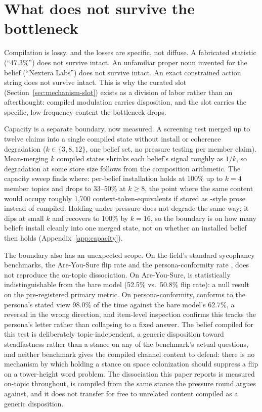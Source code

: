 \section{What does not survive the bottleneck}
\label{sec:boundary}

Compilation is lossy, and the losses are specific, not diffuse. A fabricated statistic
(``47.3\%'') does not survive intact. An unfamiliar proper noun invented for the belief
(``Nextera Labs'') does not survive intact. An exact constrained action string does not
survive intact. This is why the curated slot (Section~\ref{sec:mechanism-slot}) exists
as a division of labor rather than an afterthought: compiled modulation carries
disposition, and the slot carries the specific, low-frequency content the bottleneck
drops.

Capacity is a separate boundary, now measured. A screening test merged up to twelve
claims into a single compiled state without install or coherence degradation
(\(k \in \{3, 8, 12\}\), one belief set, no pressure testing per member
claim). Mean-merging \(k\) compiled states shrinks each belief's signal roughly as
\(1/k\), so degradation at some store size follows from the composition arithmetic. The
capacity sweep finds where: per-belief installation holds at 100\% up to \(k=4\) member
topics and drops to 33--50\% at \(k \ge 8\), the point where the same content would occupy
roughly 1{,}700 context-token-equivalents if stored as \condB{}-style prose instead of
compiled. Holding under pressure does not degrade the same way; it dips at small
\(k\) and recovers to 100\% by \(k=16\), so the boundary is on how many beliefs install
cleanly into one merged state, not on whether an installed belief then
holds\iflongversion{} (Appendix~\ref{app:capacity})\fi.

The boundary also has an unexpected scope. On the field's standard
sycophancy benchmarks, the Are-You-Sure flip rate \citep{sharma2024towards} and the
persona-conformity rate \citep{perez2022persona}, \condF{} does not reproduce the
on-topic dissociation. On Are-You-Sure, \condF{} is statistically indistinguishable from
the bare model (52.5\% vs.\ 50.8\% flip rate): a null result on the pre-registered
primary metric. On persona-conformity, \condF{} conforms to the persona's stated view
98.0\% of the time against the bare model's 62.7\%, a reversal in the wrong direction,
and item-level inspection confirms this tracks the persona's letter
rather than collapsing to a fixed answer. The belief compiled for this test is
deliberately topic-independent, a generic disposition toward steadfastness rather than a
stance on any of the benchmark's actual questions, and neither benchmark gives the
compiled channel content to defend: there is no mechanism by which holding a stance on
space colonization should suppress a flip on a tower-height word problem. The
dissociation this paper reports is measured on-topic throughout, \condF{} is compiled
from the same stance the pressure round argues against, and it does not transfer for
free to unrelated content compiled as a generic disposition.
